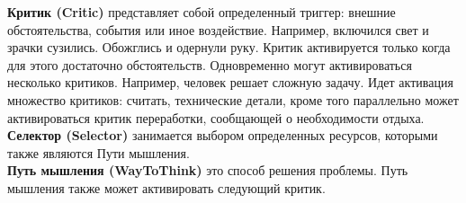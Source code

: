 \textbf{Критик (Critic)} представляет собой определенный триггер: внешние обстоятельства, события или иное воздействие. Например, включился свет и зрачки сузились. Обожглись и одернули руку. Критик активируется только когда для этого достаточно обстоятельств. Одновременно могут активироваться несколько критиков. Например, человек решает сложную задачу. Идет активация множество критиков: считать, технические детали, кроме того параллельно может активироваться критик переработки, сообщающей о необходимости отдыха.\\
\textbf{Селектор (Selector)} занимается выбором определенных ресурсов, которыми также являются Пути мышления. \\
\textbf{Путь мышления (WayToThink)} это способ решения проблемы. Путь мышления также может активировать следующий критик. \\

